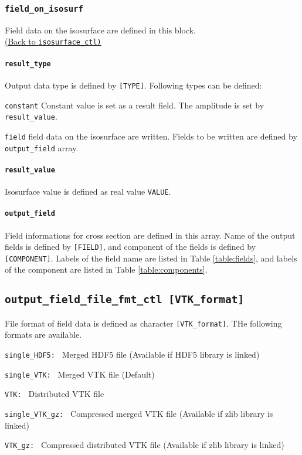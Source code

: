 %
\subsubsection{\tt field\_on\_isosurf}
\label{href_t:field_on_isosurf}
Field data on the isosurface are defined in this block. \\
\hyperref[href_i:isosurface_ctl]{(Back to {\tt isosurface\_ctl)}}

%
\paragraph{\tt result\_type}
\label{href_t:result_type}
Output data type is defined by \verb|[TYPE]|. Following types can be defined:
%
\begin{description}
	\item{\tt constant} Constant value is set as a result field. The amplitude is set by \verb|result_value|.
	\item{\tt field} field data on the isosurface are written. Fields to be written are defined by \verb|output_field| array.
\end{description}

%
\paragraph{\tt result\_value}
\label{href_t:result_value}
Isosurface value is defined as real value \verb|VALUE|.

%
\paragraph{\tt output\_field}
\label{href_t:iso_output_field}
Field informations for cross section are defined in this array. Name of the output fields is defined by \verb|[FIELD]|, and component of the fields is defined by \verb|[COMPONENT]|. Labels of the field name are listed in Table \ref{table:fields}, and labels of the component are listed in Table \ref{table:components}. \\
%
%
\subsection{\tt output\_field\_file\_fmt\_ctl  [VTK\_format]}
\label{href_t:output_field_file_fmt_ctl}
File format of field data is defined as character \verb|[VTK_format]|. THe following formats are available.
%
\begin{description}
\item{\tt single\_HDF5: }  Merged HDF5 file (Available if HDF5 library is linked)
\item{\tt single\_VTK: }   Merged VTK file (Default)
\item{\tt VTK: }           Distributed VTK file
\item{\tt single\_VTK\_gz: }   Compressed merged VTK file (Available if zlib library is linked)
\item{\tt VTK\_gz: }           Compressed distributed VTK file (Available if zlib library is linked)
\end{description}

